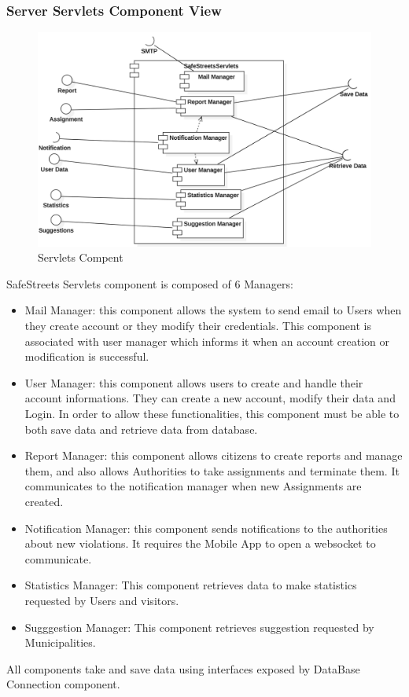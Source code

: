 \subsubsection{Server Servlets Component View}
\begin{figure}[H]
\centering
\includegraphics[width=\textwidth]{Images/ServletsComponent.png}
\caption{\label{fig:ComWI} Servlets Compent }
\end{figure}
 SafeStreets Servlets component is composed of 6 Managers:
\begin{itemize}
\item Mail Manager: this component allows the system to send email to Users when they create account or they modify their credentials. This component is associated with user manager which informs it when an account creation or modification is successful.
\item User Manager: this component allows users to create and handle their account informations. They can
create a new account, modify their data and Login. In order to allow these functionalities, this component
must be able to both save data and retrieve data from database.
\item Report Manager: this component allows citizens to create reports and manage them, and also allows Authorities to take assignments and terminate them. It communicates to the notification manager when new Assignments are created.
\item Notification Manager: this component sends notifications to the authorities about new violations.
It requires the Mobile App to open a websocket to communicate.
\item Statistics Manager: This component retrieves data to make  statistics requested by Users and visitors.
\item Sugggestion Manager: This component retrieves suggestion requested by Municipalities.
\end{itemize}
All components take and save data using interfaces exposed by DataBase Connection component.
